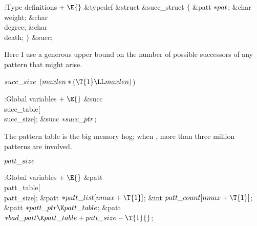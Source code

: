 \Y\B\4:Type definitions\X${}\mathrel+\E{}$\6
\&{typedef} \&{struct} \&{succ\_struct} ${}\{{}$\1\6
\&{patt} ${}{*}\\{pat}{}$;\6
\&{char} \\{weight};\6
\&{char} \\{degree};\6
\&{char} \\{death};\2\6
${}\}{}$ \&{succ};\par
\fi

Here I use a generous upper bound on the number of
possible successors of
any pattern that might arise.

\Y\B\4\D$\\{succ\_size}$ \5
$(\\{maxlen}*(\T{1}\LL\\{maxlen}){}$)\par
\Y\B\4:Global variables\X${}\mathrel+\E{}$\6
\&{succ} \\{succ\_table}[\\{succ\_size}];\6
\&{succ} ${}{*}\\{succ\_ptr}{}$;\par
\fi

The pattern table is the big memory hog; when , more than
three million patterns are involved.

\Y\B\4\D$\\{patt\_size}$ \5
\par
\Y\B\4:Global variables\X${}\mathrel+\E{}$\6
\&{patt} \\{patt\_table}[\\{patt\_size}];\6
\&{patt} ${}{*}\\{patt\_list}[\\{nmax}+\T{1}]{}$;\6
\&{int} ${}\\{patt\_count}[\\{nmax}+\T{1}]{}$;\6
\&{patt} ${}{*}\\{patt\_ptr}\K\\{patt\_table}{}$;\6
\&{patt} ${}{*}\\{bad\_patt}\K\\{patt\_table}+\\{patt\_size}-\T{1}{}$;\par
\fi

